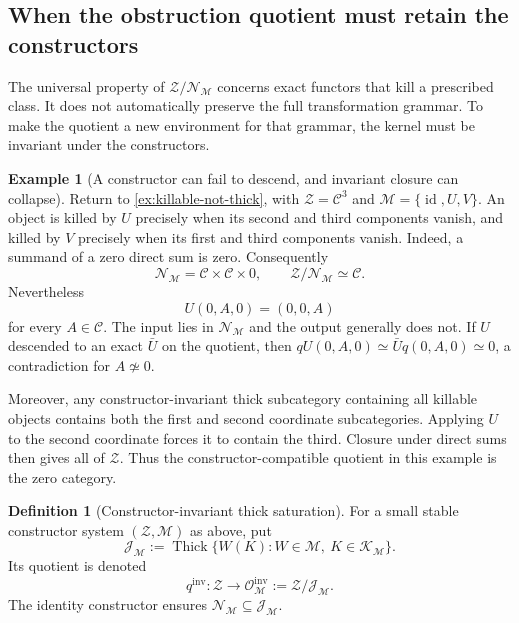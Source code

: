 \documentclass[11pt]{article}
\theoremstyle{definition}
\newtheorem{definition}[theorem]{Definition}
\newtheorem{example}[theorem]{Example}
\theoremstyle{remark}
\newcommand{\id}{\operatorname{id}}
\begin{document}
\subsection{When the obstruction quotient must retain the constructors}

The universal property of $\mathcal Z/\mathcal N_{\mathscr M}$ concerns exact functors that kill a prescribed class. It does not automatically preserve the full transformation grammar. To make the quotient a new environment for that grammar, the kernel must be invariant under the constructors.

\begin{example}[A constructor can fail to descend, and invariant closure can collapse]\label{ex:quotient-collapse}
Return to \cref{ex:killable-not-thick}, with $\mathcal Z=\mathcal C^3$ and $\mathscr M=\{\id,U,V\}$. An object is killed by $U$ precisely when its second and third components vanish, and killed by $V$ precisely when its first and third components vanish. Indeed, a summand of a zero direct sum is zero. Consequently
\[
\mathcal N_{\mathscr M}=\mathcal C\times\mathcal C\times0,
\qquad
\mathcal Z/\mathcal N_{\mathscr M}\simeq\mathcal C.
\]
Nevertheless
\[
U(0,A,0)=(0,0,A)
\]
for every $A\in\mathcal C$. The input lies in $\mathcal N_{\mathscr M}$ and the output generally does not. If $U$ descended to an exact $\bar U$ on the quotient, then
$qU(0,A,0)\simeq\bar Uq(0,A,0)\simeq0$, a contradiction for $A\not\simeq0$.

Moreover, any constructor-invariant thick subcategory containing all killable objects contains both the first and second coordinate subcategories. Applying $U$ to the second coordinate forces it to contain the third. Closure under direct sums then gives all of $\mathcal Z$. Thus the constructor-compatible quotient in this example is the zero category.
\end{example}

\begin{definition}[Constructor-invariant thick saturation]\label{def:invariant-saturation}
For a small stable constructor system $(\mathcal Z,\mathscr M)$ as above, put
\[
\mathcal J_{\mathscr M}
:=\operatorname{Thick}\{W(K):W\in\mathscr M,
\ K\in\mathcal K_{\mathscr M}\}.
\]
Its quotient is denoted
\[
q^{\mathrm{inv}}:\mathcal Z\longrightarrow
\mathcal O^{\mathrm{inv}}_{\mathscr M}
:=\mathcal Z/\mathcal J_{\mathscr M}.
\]
The identity constructor ensures $\mathcal N_{\mathscr M}\subseteq\mathcal J_{\mathscr M}$.
\end{definition}
\end{document}
